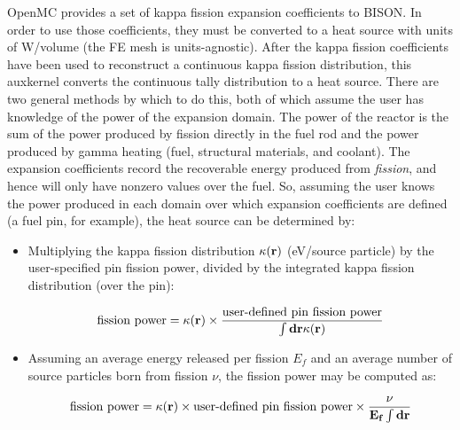 \documentclass[10pt]{article}
\newcommand{\beq}{\begin{equation}}
\newcommand{\eeq}{\end{equation}}
\newcounter{subsubsubsection}[subsubsection]
\numberwithin{equation}{section} %
\begin{document}
OpenMC provides a set of kappa fission expansion coefficients to BISON. In order to use those coefficients, they must be converted to a heat source with units of W/volume (the FE mesh is units-agnostic). After the kappa fission coefficients have been used to reconstruct a continuous kappa fission distribution, this auxkernel converts the continuous tally distribution to a heat source. There are two general methods by which to do this, both of which assume the user has knowledge of the power of the expansion domain. The power of the reactor is the sum of the power produced by fission directly in the fuel rod and the power produced by gamma heating (fuel, structural materials, and coolant). The expansion coefficients record the recoverable energy produced from {\it fission}, and hence will only have nonzero values over the fuel. So, assuming the user knows the power produced in each domain over which expansion coefficients are defined (a fuel pin, for example), the heat source can be determined by: 

\begin{itemize}
\item Multiplying the kappa fission distribution \(\kappa(\bf{r})\) (eV/source particle) by the user-specified pin fission power, divided by the integrated kappa fission distribution (over the pin):

\beq
\textrm{fission power}=\kappa(\bf{r})\times\frac{\textrm{user-defined pin fission power}}{\int d\bf{r}\kappa({\bf r})}
\eeq

\item Assuming an average energy released per fission \(E_f\) and an average number of source particles born from fission \(\nu\), the fission power may be computed as:

\beq
\textrm{fission power}=\kappa(\bf{r})\times\textrm{user-defined pin fission power}\times\frac{\nu}{E_f\int d\textbf{r}}
\eeq
\end{itemize}
\end{document}
